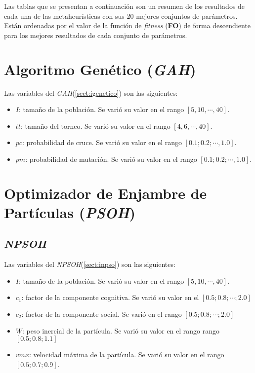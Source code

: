 	Las tablas que se presentan a continuación son un resumen de los resultados
de cada una de las metaheurísticas con sus 20 mejores conjuntos de parámetros.
Están ordenadas por el valor de la función de \emph{fitness} (\textbf{FO}) de
forma descendiente para los mejores resultados de cada conjunto de parámetros.

\section{Algoritmo Genético (\emph{GAH})}\label{sect:agenetico}

    Las variables del \emph{GAH}(\ref{sect:igenetico}) son las siguientes:
    \begin{itemize}
        \item $I$: tamaño de la población. Se varió su valor en el rango
    $[5, 10, \cdots, 40]$.
        \item $tt$: tamaño del torneo. Se varió su valor en el rango
    $[4, 6, \cdots, 40]$.
        \item $pc$: probabilidad de cruce. Se varió su valor en el rango
    $[0.1; 0.2; \cdots, 1.0]$.
        \item $pm$: probabilidad de mutación. Se varió su valor en el rango
    $[0.1; 0.2; \cdots, 1.0]$.
    \end{itemize}









\section{Optimizador de Enjambre de Partículas (\emph{PSOH})}

    \subsection{\emph{NPSOH}}\label{sect:anpso}

        Las variables del \emph{NPSOH}(\ref{sect:inpso}) son las siguientes:
        \begin{itemize}
            \item $I$: tamaño de la población. Se varió su valor en el rango
        $[5, 10, \cdots, 40]$.
            \item $c_1$: factor de la componente cognitiva. Se varió su valor en el
        $[0.5; 0.8; \cdots; 2.0]$
            \item $c_2$: factor de la componente social. Se varió en el rango
        $[0.5; 0.8; \cdots; 2.0]$
            \item $W$: peso inercial de la partícula. Se varió su valor en el rango
        rango $[0.5; 0.8; 1.1]$
            \item $vmx$: velocidad máxima de la partícula. Se varió su valor en el rango
        $[0.5; 0.7; 0.9]$.
        \end{itemize}

